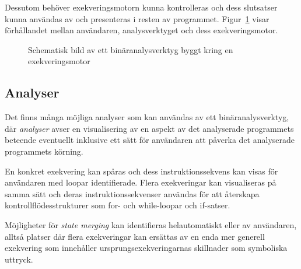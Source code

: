 Dessutom behöver exekveringsmotorn kunna kontrolleras och dess
slutsatser kunna användas av och presenteras i resten av programmet.
Figur~\ref{schematic} visar förhållandet mellan användaren, analysverktyget och
dess exekveringsmotor.

\begin{figure}[H] \centering {} \caption{ Schematisk bild av ett binäranalysverktyg byggt
	kring en exekveringsmotor }\label{schematic} \end{figure}

\subsection{Analyser}

Det finns många möjliga analyser som kan användas av ett binäranalysverktyg, där
\textit{analyser} avser en visualisering av en aspekt av det analyserade
programmets beteende eventuellt inklusive ett sätt för användaren att påverka
det analyserade programmets körning.

En konkret exekvering kan spåras och dess instruktionssekvens kan visas för
användaren med loopar identifierade. Flera exekveringar kan visualiseras på
samma sätt och deras instruktionssekvenser användas för att återskapa
kontrollflödesstrukturer som for- och while-loopar och if-satser.

Möjligheter för \textit{state merging} kan identifieras helautomatiskt eller av
användaren, alltså platser där flera exekveringar kan ersättas av en enda mer
generell exekvering som innehåller ursprungsexekveringarnas skillnader som
symboliska uttryck.

